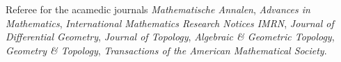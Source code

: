 

Referee for the acamedic journals \textit{Mathematische Annalen}, \textit{Advances in Mathematics}, \textit{International Mathematics Research Notices IMRN}, \textit{Journal of Differential Geometry}, \textit{Journal of Topology}, \textit{Algebraic \& Geometric Topology}, \textit{Geometry \& Topology}, \textit{Transactions of the American Mathematical Society}.

%


